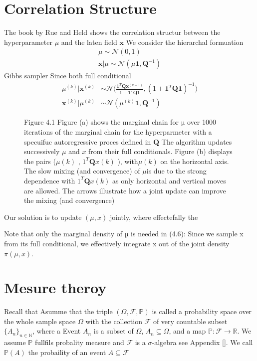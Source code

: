 \chapter{Correlation Structure}
\label{ap:Correlatation}
The book by Rue and Held shows the correlation structur between the hyperparameter $\mu$ and the laten field $\bm{x}$
We consider the hierarchal formuation 
\begin{align}
	\mu \sim \mathcal{N}(0,1)\\
	\bm{x}|\mu \sim \mathcal{N}(\mu\bm{1},\bm{Q}^{-1})
\end{align}
Gibbs sampler Since both full conditional
\begin{align}
	\mu^{(k)} | \bm{x}^{(k)} &\sim \mathcal{N} \Bigg(\frac{\bm{1}^T\bm{Q}\bm{x}^{(k-1)}}{1 + \bm{1}^T\bm{Q}\bm{1}}, (1 + \bm{1}^T\bm{Q}\bm{1})^{-1} \Bigg)\\
	\bm{x}^{(k)} | \mu^{(k)} &\sim \mathcal{N} (	\mu^{(k)}\bm{1}, \bm{Q}^{-1})
\end{align}

\begin{figure}[ht!]
	\centering
	
	\caption[Correlation structur]{Figure 4.1 Figure (a) shows the marginal chain for µ over 1000 iterations of
		the marginal chain for the hyperparmeter with a specuifuc autoregressive proces defined in $\bm{Q}$ The algorithm
		updates successively $\mu$ and $x$ from their full conditionals. Figure (b) displays
		the pairs ($\mu(k)$ ,  $1^T\bm{Q}x(k)$ ), with$\mu(k)$ on the horizontal axis. The slow mixing
		(and convergence) of $\mu$is due to the strong dependence with $1^T\bm{Q}x(k)$  as only
		horizontal and vertical moves are allowed. The arrows illustrate how a joint
		update can improve the mixing (and convergence)}
	\label{fig:FirstDAG}
\end{figure}

Our solution is to update $(\mu, x)$ jointly, where effectefally the 

Note that only the marginal density of µ is needed in (4.6): Since we
sample x from its full conditional, we eﬀectively integrate x out of the
joint density $\pi(\mu, x)$.


\chapter{Mesure theroy}
\label{ap:Correlatation}
Recall that Asumme that the triple $(\Omega, \mathcal{F} , \mathbb{P})$ is called a probability space over the whole sample space $\Omega$ with the collection $\mathcal{F}$ of very countable subset $\{ A _n \}_{n\in \mathbb{N}}$, where a Event $A_n$ is a subset of $\Omega$, $A_n \subseteq  \Omega$, and a map $\mathbb{P} : \mathcal{F} \longrightarrow \mathbb{R}$. 
We assume $\mathbb{P}$ fullfils probality measure and  $\mathcal{F}$ is a $\sigma $-algebra see Appendix \ref{}.
We call $\mathbb{P}(A)$ the probaility of an event $A \subseteq \mathcal{F}$ 
